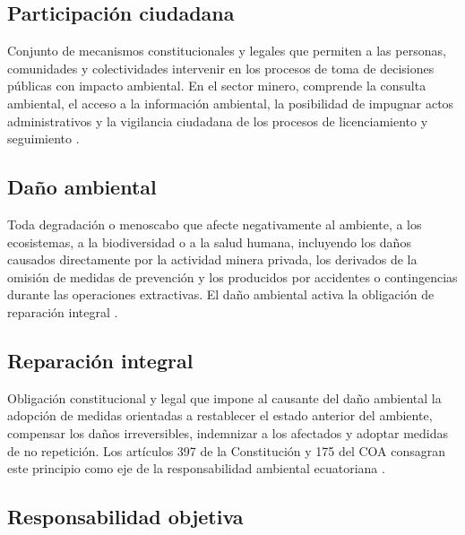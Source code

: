 \subsection{Participación ciudadana}

Conjunto de mecanismos constitucionales y legales que permiten a las personas, comunidades y colectividades intervenir en los procesos de toma de decisiones públicas con impacto ambiental. En el sector minero, comprende la consulta ambiental, el acceso a la información ambiental, la posibilidad de impugnar actos administrativos y la vigilancia ciudadana de los procesos de licenciamiento y seguimiento \parencite{cre_2008,acuerdo_escazu_2018}.

\subsection{Daño ambiental}

Toda degradación o menoscabo que afecte negativamente al ambiente, a los ecosistemas, a la biodiversidad o a la salud humana, incluyendo los daños causados directamente por la actividad minera privada, los derivados de la omisión de medidas de prevención y los producidos por accidentes o contingencias durante las operaciones extractivas. El daño ambiental activa la obligación de reparación integral \parencite{coa_2017}.

\subsection{Reparación integral}

Obligación constitucional y legal que impone al causante del daño ambiental la adopción de medidas orientadas a restablecer el estado anterior del ambiente, compensar los daños irreversibles, indemnizar a los afectados y adoptar medidas de no repetición. Los artículos 397 de la Constitución y 175 del COA consagran este principio como eje de la responsabilidad ambiental ecuatoriana \parencite{cre_2008,coa_2017}.

\subsection{Responsabilidad objetiva}

